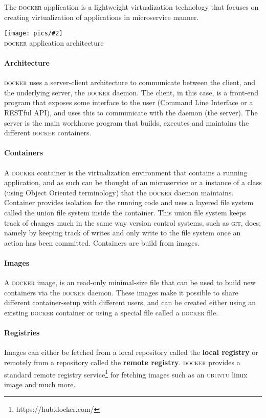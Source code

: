 \documentclass[12pt]{article}
\newcommand{\img}[3] {
	\begin{center}
	\texttt{[image: pics/\#2]}\\
	{\small #3}
	\end{center}
}
\newcommand{\docker}[0] {\textsc{docker}}
\newcommand{\git} {\textsc{git}}
\newcommand{\ubuntu} {\textsc{ubuntu}}
\begin{document}
The \docker{} application is a lightweight virtualization technology that focuses on creating virtualization of applications in microservice manner.\cite{DBLP:journals/software/Anderson15}

\img{0.6}{arch}{\docker{} application architecture}

\paragraph{Architecture} \docker{} uses a server-client architecture to communicate between the client, and the underlying server, the \docker{} daemon. The client, in this case, is a front-end program that exposes some interface to the user (Command Line Interface or a RESTful API), and uses this to communicate with the daemon (the server). The server is the main workhorse program that builds, executes and maintains the different \docker{} containers.

\paragraph{Containers} A \docker{} container is the virtualization environment that contains a running application, and as such can be thought of an microservice or a instance of a class (using Object Oriented terminology) that the \docker{} daemon maintains. Container provides isolation for the running code and uses a layered file system called the union file system inside the container.\cite{DBLP:journals/software/Anderson15} This union file system keeps track of changes much in the same way version control systems, such as \git{}, does; namely by keeping track of writes and only write to the file system once an action has been committed. Containers are build from images.

\paragraph{Images} A \docker{} image, is an read-only minimal-size file that can be used to build new containers via the \docker{} daemon. These images make it possible to share different container-setup with different users, and can be created either using an existing \docker{} container or using a special file called a \docker{} file. 

\paragraph{Registries}
Images can either be fetched from a local repository called the \textbf{local registry} or remotely from a repository called the \textbf{remote registry}. \docker{} provides a standard remote registry service\footnote{https://hub.docker.com/} for fetching images such as an \ubuntu{} linux image and much more.
\end{document}
